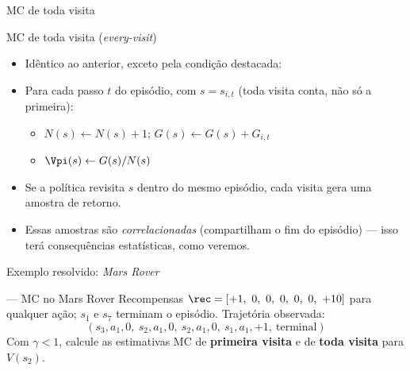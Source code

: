 \documentclass[aspectratio=169, 11pt]{beamer}
\begin{document}
\begin{frame}{MC de toda visita}
  \begin{algbox}{MC de toda visita (\emph{every-visit})}
    \begin{itemize}\setlength{\itemsep}{0.2ex}
      \item Idêntico ao anterior, exceto pela condição destacada:
      \item Para cada passo $t$ do episódio, com $s = s_{i,t}$
        (\alert{toda} visita conta, não só a primeira):
      \begin{itemize}
        \item $N(s) \leftarrow N(s) + 1$; \quad $G(s) \leftarrow G(s) + G_{i,t}$
        \item $\Vpi(s) \leftarrow G(s)/N(s)$
      \end{itemize}
    \end{itemize}
  \end{algbox}

  \begin{itemize}
    \item Se a política revisita $s$ dentro do mesmo episódio, cada visita
      gera uma amostra de retorno.
    \item Essas amostras são \emph{correlacionadas} (compartilham o fim do
      episódio) — isso terá consequências estatísticas, como veremos.
  \end{itemize}
\end{frame}

\begin{frame}{Exemplo resolvido: \emph{Mars Rover}}
  \centering

  \medskip
  \begin{exbox}{— MC no Mars Rover}
    Recompensas $\rec = [+1,\ 0,\ 0,\ 0,\ 0,\ 0,\ +10]$ para qualquer ação;
    $s_1$ e $s_7$ terminam o episódio. Trajetória observada:
    \[
      (s_3, a_1, 0,\ s_2, a_1, 0,\ s_2, a_1, 0,\ s_1, a_1, +1,\ \text{terminal})
    \]
    Com $\gamma < 1$, calcule as estimativas MC de \textbf{primeira visita}
    e de \textbf{toda visita} para $V(s_2)$.
  \end{exbox}
\end{frame}
\end{document}
